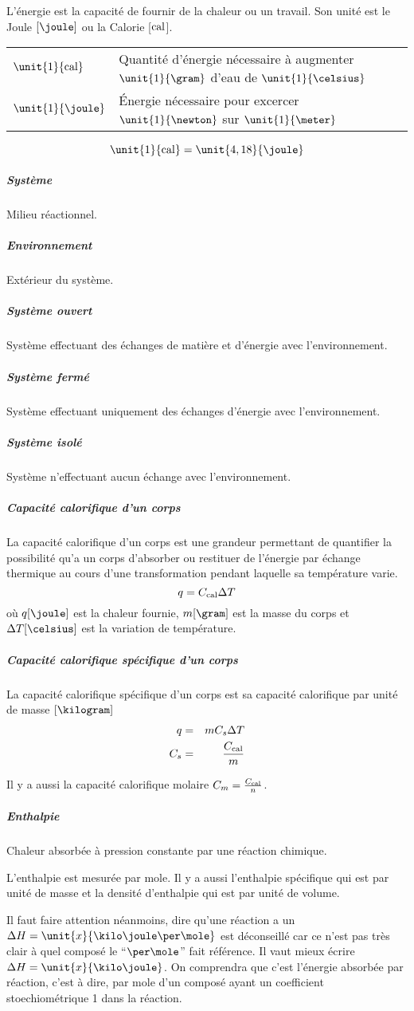 \documentclass[11pt,a4paper,french]{article}
\begin{document}
L'énergie est la capacité de fournir de la chaleur ou un travail. Son unité est le Joule $[\joule]$ ou la Calorie [$\mathrm{cal}$].
\begin{center}
	\begin{tabular}{ll}
		$\unit{1}{\calo}$ & Quantité  d'énergie nécessaire à augmenter $\unit{1}{\gram}$ d'eau de $\unit{1}{\celsius}$\\
		$\unit{1}{\joule}$ & \'Energie nécessaire pour excercer $\unit{1}{\newton}$ sur $\unit{1}{\meter}$
	\end{tabular}
\end{center}
\[ \unit{1}{\calo} = \unit{4,18}{\joule} \]

\subparagraph{Système} Milieu réactionnel.
\subparagraph{Environnement} Extérieur du système.
\subparagraph{Système ouvert} Système effectuant des échanges de matière et d'énergie avec l'environnement.
\subparagraph{Système fermé} Système effectuant uniquement des échanges d'énergie avec l'environnement.
\subparagraph{Système isolé} Système n'effectuant aucun échange avec l'environnement.
\subparagraph{Capacité calorifique d'un corps} \label{sec:C_cal}
La capacité calorifique d'un corps est une grandeur permettant de quantifier la possibilité qu'a un corps d'absorber ou restituer de l'énergie par échange thermique au cours d'une transformation pendant laquelle sa température varie.
\[ q = C_\mathrm{cal} \Delta T \]
où $q[\joule]$ est la chaleur fournie, $m[\gram]$ est la masse du corps et $\Delta T[\celsius]$ est la variation de température. %

\subparagraph{Capacité calorifique spécifique d'un corps} \label{sec:C_s}
La capacité calorifique spécifique d'un corps est sa capacité calorifique par unité de masse $[\kilogram]$
\begin{eqnarray*}
	q &=& m C_s \Delta T\\
	C_s &=& \frac{C_\mathrm{cal}}{m}
\end{eqnarray*}

Il y a aussi la capacité calorifique molaire $C_m = \frac{C_\mathrm{cal}}{n}$.

\subparagraph{Enthalpie} \label{sec:DH}
Chaleur absorbée à pression constante par une réaction chimique.

L'enthalpie est mesurée par mole.
Il y a aussi l'enthalpie spécifique qui est par unité de masse et la densité d'enthalpie qui est par unité de volume.

Il faut faire attention néanmoins, dire qu'une réaction a un $\Delta H = \unit{x}{\kilo\joule\per\mole}$ est déconseillé car ce n'est pas très clair à quel composé le ``$\per\mole$'' fait référence.
Il vaut mieux écrire $\Delta H = \unit{x}{\kilo\joule}$.
On comprendra que c'est l'énergie absorbée par réaction, c'est à dire, par mole d'un composé ayant un coefficient stoechiométrique 1 dans la réaction.
\end{document}

